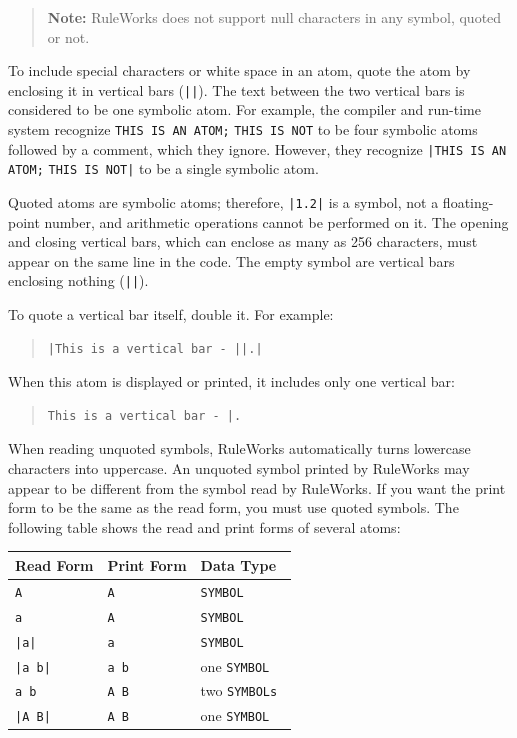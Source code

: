 \begin{quote}
  \textbf{Note:} RuleWorks does not support null characters in any
  symbol, quoted or not.
\end{quote}

To include special characters or white space in an atom, quote the
atom by enclosing it in vertical bars (\verb,||,). The text between
the two vertical bars is considered to be one symbolic atom. For
example, the compiler and run-time system recognize
\verb|THIS IS AN ATOM;| \verb|THIS IS NOT| to be four symbolic atoms followed
by a comment, which they ignore. However, they recognize
\verb,|THIS IS AN ATOM;, \verb,THIS IS NOT|, to be a single symbolic
atom.

Quoted atoms are symbolic atoms; therefore, \verb,|1.2|, is a symbol,
not a floating-point number, and arithmetic operations cannot be
performed on it. The opening and closing vertical bars, which can
enclose as many as 256 characters, must appear on the same line in the
code. The empty symbol are vertical bars enclosing nothing
(\verb,||,).

To quote a vertical bar itself, double it. For example:

\begin{quote}
\begin{verbatim}
|This is a vertical bar - ||.|
\end{verbatim}
\end{quote}

When this atom is displayed or printed, it includes only one
vertical bar:

\begin{quote}
\begin{verbatim}
This is a vertical bar - |.
\end{verbatim}
\end{quote}

When reading unquoted symbols, RuleWorks automatically turns lowercase
characters into uppercase. An unquoted symbol printed by RuleWorks may
appear to be different from the symbol read by RuleWorks. If you want
the print form to be the same as the read form, you must use quoted
symbols. The following table shows the read and print forms of several
atoms:

\begin{center}
  \begin{tabular}{lll}
    \toprule
    Read Form & Print Form & Data Type \\
    \midrule
    \verb,A, &  \verb,A, & \tt{SYMBOL} \\
    \verb,a,        & \verb,A,          & \tt{SYMBOL} \\
    \verb,|a|,       & \verb,a,          & \tt{SYMBOL} \\
    \verb,|a b|,     & \verb,a b,        & one \tt{SYMBOL} \\
    \verb,a b,       & \verb,A B,        & two \tt{SYMBOL}s \\
    \verb,|A B|,     & \verb,A B,        & one \tt{SYMBOL} \\
  \bottomrule
  \end{tabular}
\end{center}

